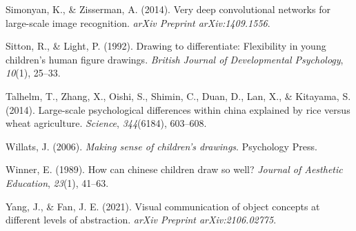\documentclass[
  english,
  man]{apa6}
\begin{document}
\leavevmode\hypertarget{ref-simonyan2014very}{}%
Simonyan, K., \& Zisserman, A. (2014). Very deep convolutional networks for large-scale image recognition. \emph{arXiv Preprint arXiv:1409.1556}.

\leavevmode\hypertarget{ref-sitton1992drawing}{}%
Sitton, R., \& Light, P. (1992). Drawing to differentiate: Flexibility in young children's human figure drawings. \emph{British Journal of Developmental Psychology}, \emph{10}(1), 25--33.

\leavevmode\hypertarget{ref-talhelm2014large}{}%
Talhelm, T., Zhang, X., Oishi, S., Shimin, C., Duan, D., Lan, X., \& Kitayama, S. (2014). Large-scale psychological differences within china explained by rice versus wheat agriculture. \emph{Science}, \emph{344}(6184), 603--608.

\leavevmode\hypertarget{ref-willats2006making}{}%
Willats, J. (2006). \emph{Making sense of children's drawings}. Psychology Press.

\leavevmode\hypertarget{ref-winner1989can}{}%
Winner, E. (1989). How can chinese children draw so well? \emph{Journal of Aesthetic Education}, \emph{23}(1), 41--63.

\leavevmode\hypertarget{ref-yang2021visual}{}%
Yang, J., \& Fan, J. E. (2021). Visual communication of object concepts at different levels of abstraction. \emph{arXiv Preprint arXiv:2106.02775}.
\end{document}
